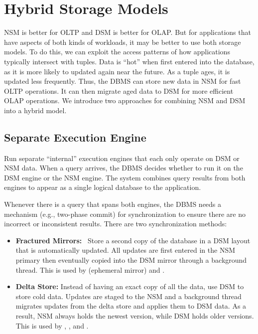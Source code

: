 \documentclass[11pt]{article}
\begin{document}
\section{Hybrid Storage Models}
NSM is better for OLTP and DSM is better for OLAP. But for applications that have aspects of both kinds of workloads, it may be better to use both storage models. To do this, we can exploit the access patterns of how applications typically intersect with tuples. Data is ``hot'' when first entered into the database, as it is more likely to updated again near the future. As a tuple ages, it is updated less frequently. Thus, the DBMS can store new data in NSM for fast OLTP operations. It can then migrate aged data to DSM for more efficient OLAP operations. We introduce two approaches for combining NSM and DSM into a hybrid model.

\subsection*{Separate Execution Engine}
Run separate ``internal'' execution engines that each only operate on DSM or NSM data.
When a query arrives, the DBMS decides whether to run it on the DSM engine or the NSM engine. The system combines query results from both engines to appear as a single logical database to the application.

Whenever there is a query that spans both engines, the DBMS needs a mechanism (e.g., two-phase commit) for synchronization to ensure there are no incorrect or inconsistent results. There are two synchronization methods:
\begin{itemize}
    \item \textbf{Fractured Mirrors:}~\cite{p430-ramamurthy} Store a second copy of the database in a DSM layout that is automatically updated. All updates are first entered in the NSM primary then eventually copied into the DSM mirror through a background thread. This is used by  (ephemeral mirror) and .
    \item \textbf{Delta Store:} Instead of having an exact copy of all the data, use DSM to store cold data. Updates are staged to the NSM and a background thread migrates updates from the delta store and applies them to DSM data. As a result, NSM always holds the newest version, while DSM holds older versions. This is used by , , and .
\end{itemize}
\end{document}
